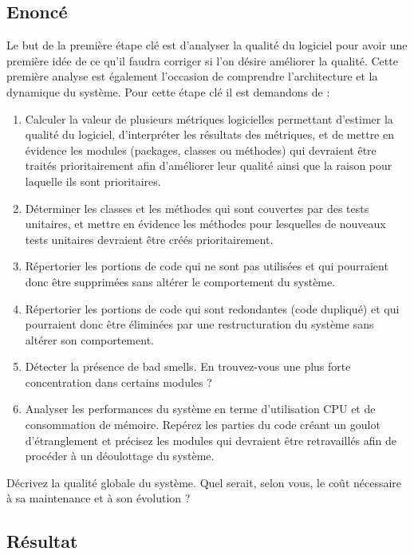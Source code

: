 \documentclass[12pt,a4paper,final]{article}
\begin{document}
\subsection{Enoncé}
Le but de la première étape clé est d'analyser la qualité du logiciel pour avoir une première idée de ce qu'il faudra corriger si l'on désire améliorer la qualité. Cette première analyse est également l'occasion de comprendre l'architecture et la dynamique du système.
Pour cette étape clé il est demandons de :
\begin{enumerate}
\item Calculer la valeur de plusieurs métriques logicielles permettant d'estimer la qualité du logiciel, d'interpréter les résultats des métriques, et de mettre en évidence les modules (packages, classes ou méthodes) qui devraient être traités prioritairement afin d'améliorer leur qualité ainsi que la raison pour laquelle ils sont prioritaires.
\item Déterminer les classes et les méthodes qui sont couvertes par des tests unitaires, et mettre en évidence les méthodes pour lesquelles de nouveaux tests unitaires devraient être créés prioritairement.
\item Répertorier les portions de code qui ne sont pas utilisées et qui pourraient donc être supprimées sans altérer le comportement du système.
\item Répertorier les portions de code qui sont redondantes (code dupliqué) et qui pourraient donc être éliminées par une restructuration du système sans altérer son comportement.
\item Détecter la présence de bad smells. En trouvez-vous une plus forte concentration dans certains modules ?
\item Analyser les performances du système en terme d'utilisation CPU et de consommation de mémoire. Repérez les parties du code créant un goulot d'étranglement et précisez les modules qui devraient être retravaillés afin de procéder à un déoulottage du système.
\end{enumerate}
Décrivez la qualité globale du système. Quel serait, selon vous, le coût nécessaire à sa maintenance et à son évolution ?
\subsection{Résultat}
\end{document}
